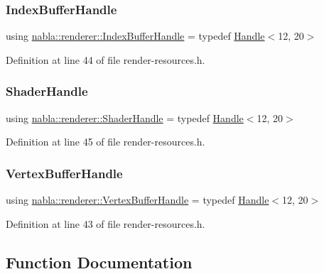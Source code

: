 \subsubsection{\texorpdfstring{IndexBufferHandle}{IndexBufferHandle}}
{\footnotesize\ttfamily using \mbox{\hyperlink{namespacenabla_1_1renderer_a6c2d393ca75aa2575fca09b5ef8bda55}{nabla\+::renderer\+::\+Index\+Buffer\+Handle}} = typedef \mbox{\hyperlink{classnabla_1_1renderer_1_1_handle}{Handle}}$<$12, 20$>$}



Definition at line 44 of file render-\/resources.\+h.

\mbox{\label{namespacenabla_1_1renderer_a351c881c3df21186064938743d67dd85}} 
\subsubsection{\texorpdfstring{ShaderHandle}{ShaderHandle}}
{\footnotesize\ttfamily using \mbox{\hyperlink{namespacenabla_1_1renderer_a351c881c3df21186064938743d67dd85}{nabla\+::renderer\+::\+Shader\+Handle}} = typedef \mbox{\hyperlink{classnabla_1_1renderer_1_1_handle}{Handle}}$<$12, 20$>$}



Definition at line 45 of file render-\/resources.\+h.

\mbox{\label{namespacenabla_1_1renderer_aa901f31283abb372f2a5ca3b90e09f54}} 
\subsubsection{\texorpdfstring{VertexBufferHandle}{VertexBufferHandle}}
{\footnotesize\ttfamily using \mbox{\hyperlink{namespacenabla_1_1renderer_aa901f31283abb372f2a5ca3b90e09f54}{nabla\+::renderer\+::\+Vertex\+Buffer\+Handle}} = typedef \mbox{\hyperlink{classnabla_1_1renderer_1_1_handle}{Handle}}$<$12, 20$>$}



Definition at line 43 of file render-\/resources.\+h.



\subsection{Function Documentation}
\mbox{\label{namespacenabla_1_1renderer_a03960a6e4a33e91698d490ec9f827671}} 

